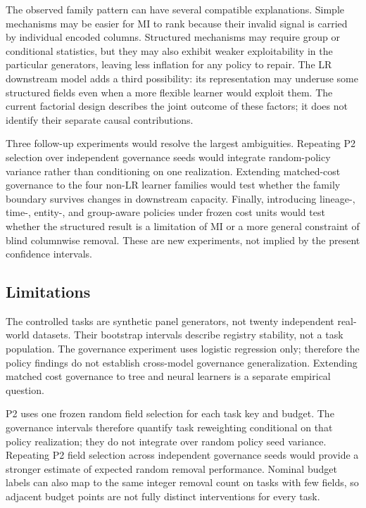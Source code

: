 \documentclass[sigconf,review]{acmart}
\begin{document}
The observed family pattern can have several compatible explanations. Simple
mechanisms may be easier for MI to rank because their invalid signal is carried
by individual encoded columns. Structured mechanisms may require group or
conditional statistics, but they may also exhibit weaker exploitability in the
particular generators, leaving less inflation for any policy to repair. The LR
downstream model adds a third possibility: its representation may underuse some
structured fields even when a more flexible learner would exploit them. The
current factorial design describes the joint outcome of these factors; it does
not identify their separate causal contributions.

Three follow-up experiments would resolve the largest ambiguities. Repeating
P2 selection over independent governance seeds would integrate random-policy
variance rather than conditioning on one realization. Extending matched-cost
governance to the four non-LR learner families would test whether the family
boundary survives changes in downstream capacity. Finally, introducing
lineage-, time-, entity-, and group-aware policies under frozen cost units would
test whether the structured result is a limitation of MI or a more general
constraint of blind columnwise removal. These are new experiments, not implied
by the present confidence intervals.

\subsection{Limitations}

The controlled tasks are synthetic panel generators, not twenty independent
real-world datasets. Their bootstrap intervals describe registry stability,
not a task population. The governance experiment uses logistic regression only;
therefore the policy findings do not establish cross-model governance
generalization. Extending matched cost governance to tree and neural learners
is a separate empirical question.

P2 uses one frozen random field selection for each task key and budget. The
governance intervals therefore quantify task reweighting conditional on that
policy realization; they do not integrate over random policy seed variance.
Repeating P2 field selection across independent governance seeds would provide
a stronger estimate of expected random removal performance. Nominal budget
labels can also map to the same integer removal count on tasks with few fields,
so adjacent budget points are not fully distinct interventions for every task.
\end{document}
